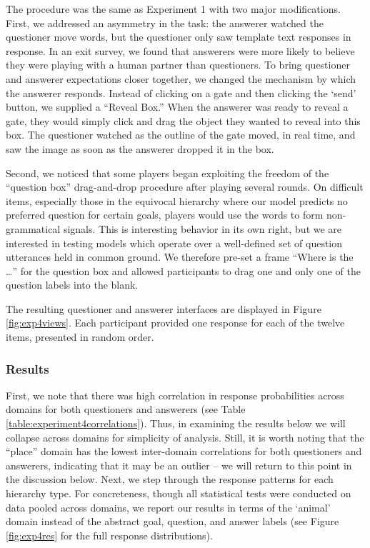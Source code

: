\documentclass[12pt, floatsintext, jou]{apa6}
\begin{document}
The procedure was the same as Experiment 1 with two major modifications. First, we addressed an asymmetry in the task: the answerer watched the questioner move words, but the questioner only saw template text responses in response. In an exit survey, we found that answerers were more likely to believe they were playing with a  human partner than questioners. To bring questioner and answerer expectations closer together, we changed the mechanism by which the answerer responds. Instead of clicking on a gate and then clicking the `send' button, we supplied a ``Reveal Box.'' When the answerer was ready to reveal a gate, they would simply click and drag the object they wanted to reveal into this box. The questioner watched as the outline of the gate moved, in real time, and saw the image as soon as the answerer dropped it in the box. 

Second, we noticed that some players began exploiting the freedom of the ``question box'' drag-and-drop procedure after playing several rounds. On difficult items, especially those in the equivocal hierarchy where our model predicts no preferred question for certain goals, players would use the words to form non-grammatical signals. This is interesting behavior in its own right, but we are interested in testing models which operate over a well-defined set of question utterances held in common ground. We therefore pre-set a frame ``Where is the \dots'' for the question box and allowed participants to drag one and only one of the question labels into the blank. 

The resulting questioner and answerer interfaces are displayed in Figure \ref{fig:exp4views}.  Each participant provided one response for each of the twelve items, presented in random order. 

\subsubsection{Results}

First, we note that there was high correlation in response probabilities across domains for both questioners and answerers (see Table \ref{table:experiment4correlations}). Thus, in examining the results below we will collapse across domains for simplicity of analysis. Still, it is worth noting that the ``place'' domain has the lowest inter-domain correlations for both questioners and answerers, indicating that it may be an outlier -- we will return to this point in the discussion below.  Next, we step through the response patterns for each hierarchy type. For concreteness, though all statistical tests were conducted on data pooled across domains, we report our results in terms of the `animal' domain instead of the abstract goal, question, and answer labels (see Figure \ref{fig:exp4res} for the full response distributions).
\end{document}
